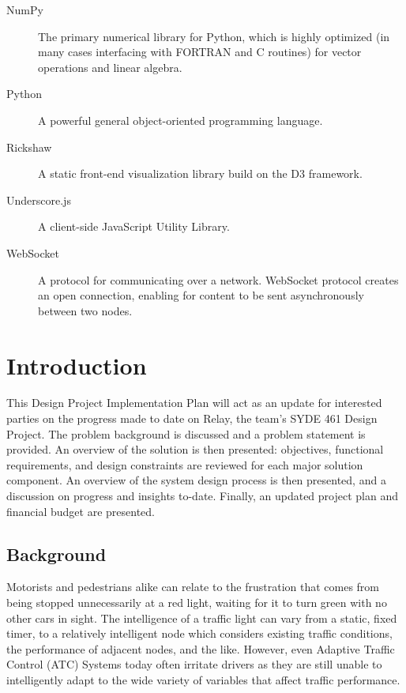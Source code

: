 \documentclass{report}
\begin{document}
\begin{description}
\item[NumPy] The primary numerical library for Python, which is highly optimized (in many cases interfacing with FORTRAN and C routines) for vector operations and linear algebra.
\item[Python] A powerful general object-oriented programming language.
\item[Rickshaw] A static front-end visualization library build on the D3 framework.
\item[Underscore.js] A client-side JavaScript Utility Library.
\item[WebSocket] A protocol for communicating over a network. WebSocket protocol creates an open connection, enabling for content to be sent asynchronously between two nodes.
\end{description}


\newpage
\doublespacing
{}

\chapter{Introduction}
\setlength{\parindent}{1cm}
This Design Project Implementation Plan will act as an update for interested parties on the progress made to date on Relay, the team's SYDE 461 Design Project. The problem background is discussed and a problem statement is provided. An overview of the solution is then presented: objectives, functional requirements, and design constraints are reviewed for each major solution component. An overview of the system design process is then presented, and a discussion on progress and insights to-date. Finally, an updated project plan and financial budget are presented.\\


\section{Background}
Motorists and pedestrians alike can relate to the frustration that comes from being stopped unnecessarily at a red light, waiting for it to turn green with no other cars in sight.
The intelligence of a traffic light can vary from a static, fixed timer, to a relatively intelligent node which considers existing traffic conditions, the performance of adjacent nodes, and the like.
However, even Adaptive Traffic Control (ATC) Systems today often irritate drivers as they are still unable to intelligently adapt to the wide variety of variables that affect traffic performance.\\
\end{document}
